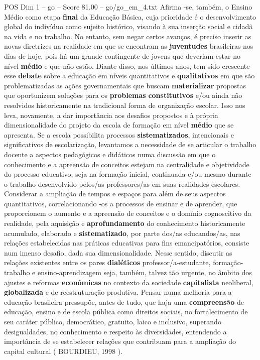 \begin{textsample}{POS Dim 1 – go – Score 81.00 – go/go\_em\_4.txt}
Afirma -se, também, o Ensino Médio como etapa \textbf{final} da Educação Básica, cuja prioridade é o desenvolvimento global do indivíduo como sujeito histórico, visando à sua inserção social e cidadã na vida e no trabalho.
No entanto, sem negar certos avanços, é preciso inserir as novas diretrizes na realidade em que se encontram as \textbf{juventudes} brasileiras nos dias de hoje, pois há um grande contingente de jovens que deveriam estar no nível \textbf{médio} e que não estão.
Diante disso, nos últimos anos, tem sido crescente esse \textbf{debate} sobre a educação em níveis quantitativos e \textbf{qualitativos} em que são problematizadas as ações governamentais que buscam \textbf{materializar} propostas que oportunizem soluções para os \textbf{problemas} \textbf{constitutivos} e/ou ainda não resolvidos historicamente na tradicional forma de organização escolar.
Isso nos leva, novamente, a dar importância aos desafios propostos e à própria dimensionalidade do projeto da escola de formação em nível \textbf{médio} que se apresenta.
Se a escola possibilita processos \textbf{sistematizados}, intencionais e significativos de escolarização, levantamos a necessidade de se articular o trabalho docente a aspectos pedagógicos e didáticos numa discussão em que o conhecimento e a apreensão de conceitos estejam na centralidade e objetividade do processo educativo, seja na formação inicial, continuada e/ou mesmo durante o trabalho desenvolvido pelos/as professores/as em suas realidades escolares.
Considerar a ampliação de tempos e espaços para além de seus aspectos quantitativos, correlacionando -os a processos de ensinar e de aprender, que proporcionem o aumento e a apreensão de conceitos e o domínio cognoscitivo da realidade, pela aquisição e \textbf{aprofundamento} do conhecimento historicamente acumulado, elaborado e \textbf{sistematizado}, por parte dos/as educandos/as, nas relações estabelecidas nas práticas educativas para fins emancipatórios, consiste num imenso desafio, dada sua dimensionalidade.
Nesse sentido, discutir as relações existentes entre os pares \textbf{dialéticos} professor/a-estudante, formação-trabalho e ensino-aprendizagem seja, também, talvez tão urgente, no âmbito dos ajustes e reformas \textbf{econômicas} no contexto da sociedade \textbf{capitalista} neoliberal, \textbf{globalizada} e de reestruturação produtiva.
Pensar numa melhoria para a educação brasileira pressupõe, antes de tudo, que haja uma \textbf{compreensão} de educação, ensino e de escola pública como direitos sociais, no fortalecimento de seu caráter público, democrático, gratuito, laico e inclusivo, superando desigualdades, no conhecimento e respeito às diversidades, entendendo a importância de se estabelecer relações que contribuam para a ampliação do capital cultural ( BOURDIEU, 1998 ).

\end{textsample}
